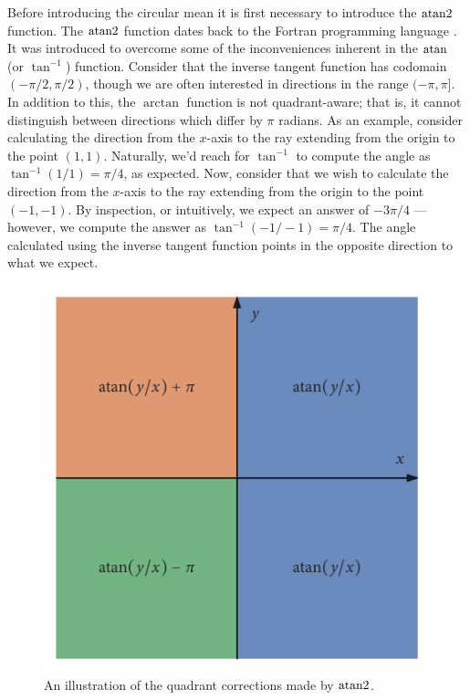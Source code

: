 Before introducing the circular mean it is first necessary to introduce the $\operatorname{atan2}$
function. The $\operatorname{atan2}$ function dates back to the Fortran programming language
\parencite{organick66}. It was introduced to overcome some of the inconveniences inherent
in the $\atan$ (or $\tan^{-1}$) function. Consider that the inverse tangent function has
codomain $(-\pi/2, \pi/2)$, though we are often interested in directions in the range
$(-\pi, \pi]$. In addition to this, the $\arctan$ function is not quadrant-aware; that is,
it cannot distinguish between directions which differ by $\pi$ radians.  As an example,
consider calculating the direction from the $x$-axis to the ray extending from the origin
to the point $(1, 1)$. Naturally, we'd reach for $\tan^{-1}$ to compute the angle as
$\tan^{-1}(1/1) = \pi/4$, as expected. Now, consider that we wish to calculate the
direction from the $x$-axis to the ray extending from the origin to the point $(-1, -1)$.
By inspection, or intuitively, we expect an answer of $-3\pi/4$ --- however, we compute
the answer as $\tan^{-1}(-1/-1) = \pi/4$. The angle calculated using the inverse tangent
function points in the opposite direction to what we expect.

\begin{figure}[tb]
	\includegraphics{atan_quadrants.pdf}
	\caption{An illustration of the quadrant corrections made by $\operatorname{atan2}$.}
	\label{fig:atan_quadrants}
\end{figure}

